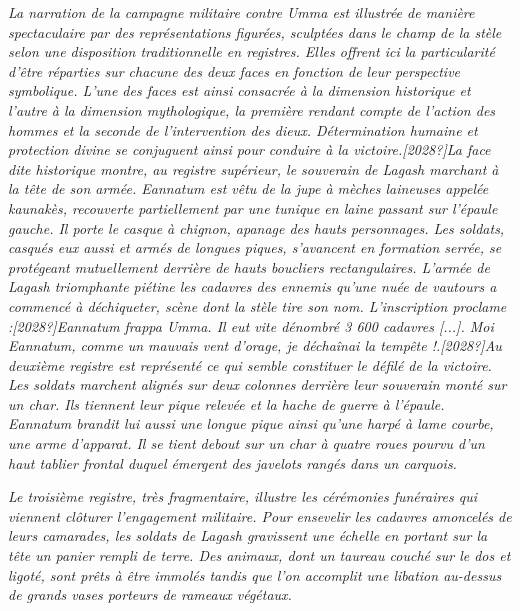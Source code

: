 \documentclass[a4paper,10pt]{article}
\begin{document}
\textit{La narration de la campagne militaire contre Umma est illustrée
de manière spectaculaire par des représentations figurées, sculptées
dans le champ de la stèle selon une disposition traditionnelle en
registres. Elles offrent ici la particularité d'être
réparties sur chacune des deux faces en fonction de leur perspective
symbolique. L'une des faces est ainsi consacrée à la
dimension {\textquotedbl}historique{\textquotedbl} et
l'autre à la} \textit{dimension
{\textquotedbl}mythologique{\textquotedbl}, la première rendant compte
de l'action des hommes et la seconde de
l'intervention des dieux. Détermination humaine et
protection divine se conjuguent ainsi pour conduire à la
victoire.[2028?]La face dite {\textquotedbl}historique{\textquotedbl}
montre, au registre supérieur, le souverain de Lagash marchant à la
tête de son armée. Eannatum est vêtu de la jupe à mèches laineuses
appelée kaunakès, recouverte partiellement par une tunique en laine
passant sur l'épaule gauche. Il porte le casque à
chignon, apanage des hauts personnages. Les soldats, casqués eux aussi
et armés de longues piques, s'avancent en formation
serrée, se protégeant mutuellement derrière de hauts boucliers
rectangulaires. L'armée de Lagash triomphante piétine
les cadavres des ennemis qu'une nuée de vautours a
commencé à déchiqueter, scène dont la stèle tire son nom.
L'inscription proclame
:[2028?]{\textquotedbl}}\textit{Eannatum }\textit{frappa Umma. Il eut
vite dénombré 3 600 cadavres [...]. Moi Eannatum, comme un mauvais vent
d'orage, je déchaînai la tempête
!}\textit{{\textquotedbl}.[2028?]Au deuxième registre est représenté ce
qui semble constituer le défilé de la victoire. Les soldats marchent
alignés sur deux colonnes derrière leur souverain monté sur un char.
Ils tiennent leur pique relevée et la hache de guerre à
l'épaule. Eannatum brandit lui aussi une longue pique
ainsi qu'une harpé à lame courbe, une arme
d'apparat. Il se tient debout sur un char à quatre
roues pourvu d'un haut tablier frontal duquel émergent
des javelots rangés dans un carquois.}

\textit{Le troisième registre, très fragmentaire, illustre les
cérémonies funéraires qui viennent clôturer
l'engagement militaire. Pour ensevelir les cadavres
amoncelés de leurs camarades, les soldats de Lagash gravissent une
échelle en portant sur la tête un panier rempli de terre. Des animaux,
dont un taureau couché sur le dos et ligoté, sont prêts à être immolés
tandis que l'on accomplit une libation au-dessus de
grands vases porteurs de rameaux végétaux.}
\end{document}
